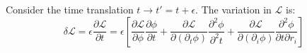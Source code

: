 \documentclass[12pt]{article}
\begin{document}






Consider the time translation $t \to t' = t + \epsilon$. The variation in $\mathcal{L}$ is:
\begin{equation}
    \delta \mathcal{L} = \epsilon \frac{\partial \mathcal{L}}{\partial t} = \epsilon \left[ \frac{\partial \mathcal{L}}{\partial \phi} \frac{\partial \phi}{\partial t} + \frac{\partial \mathcal{L}}{\partial (\partial_{t} \phi)} \frac{\partial^{2} \phi}{\partial^{2} t} + \frac{\partial \mathcal{L}}{\partial (\partial_{i} \phi)} \frac{\partial^{2} \phi}{\partial t \partial r_{i}} \right]
\end{equation}
\end{document}
